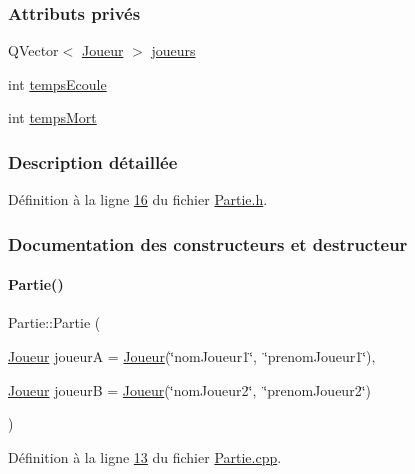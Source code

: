 \subsubsection*{Attributs privés}
\begin{DoxyCompactItemize}
\item 
Q\+Vector$<$ \hyperlink{class_joueur}{Joueur} $>$ \hyperlink{class_partie_a98fa2810599b3eb46d57df2b5836a3f4}{joueurs}
\item 
int \hyperlink{class_partie_a58664212ddb4954a59298f1de8256477}{temps\+Ecoule}
\item 
int \hyperlink{class_partie_a55a5e6e0b757d74fa9aceefa7228ead9}{temps\+Mort}
\end{DoxyCompactItemize}


\subsubsection{Description détaillée}


Définition à la ligne \hyperlink{_partie_8h_source_l00016}{16} du fichier \hyperlink{_partie_8h_source}{Partie.\+h}.



\subsubsection{Documentation des constructeurs et destructeur}
\mbox{\label{class_partie_ae1a2da8080f9f51bdd7e9d864080444c}} 
\paragraph{\texorpdfstring{Partie()}{Partie()}}
{\footnotesize\ttfamily Partie\+::\+Partie (\begin{DoxyParamCaption}\item[{\hyperlink{class_joueur}{Joueur}}]{joueurA = {\ttfamily \hyperlink{class_joueur}{Joueur}(\char`\"{}nomJoueur1\char`\"{},~\char`\"{}prenomJoueur1\char`\"{})},  }\item[{\hyperlink{class_joueur}{Joueur}}]{joueurB = {\ttfamily \hyperlink{class_joueur}{Joueur}(\char`\"{}nomJoueur2\char`\"{},~\char`\"{}prenomJoueur2\char`\"{})} }\end{DoxyParamCaption})}



Définition à la ligne \hyperlink{_partie_8cpp_source_l00013}{13} du fichier \hyperlink{_partie_8cpp_source}{Partie.\+cpp}.



